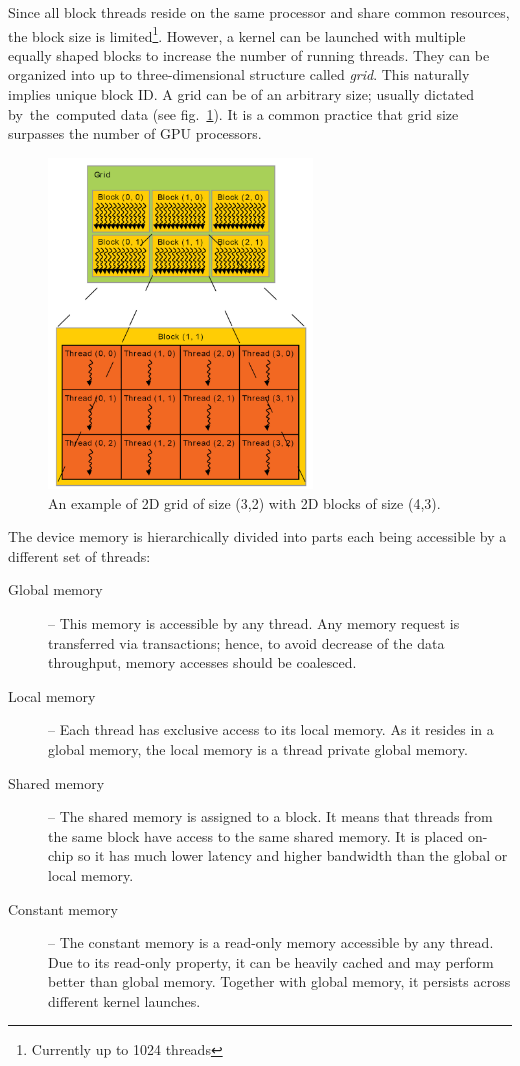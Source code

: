 Since all block threads reside on the same processor and share common resources, the block size is limited\footnote{Currently up to 1024 threads}. However, a kernel can be launched with multiple equally shaped blocks to increase the number of running threads. They can be organized into up to three-dimensional structure called \emph{grid}. This naturally implies unique block ID. A grid can be of an arbitrary size; usually dictated by~the~computed data (see fig.~\ref{fig02:grid}). It is a common practice that grid size surpasses the number of GPU processors.


\begin{figure}\centering
	\includegraphics[width=7cm]{img/grid}
	\caption{An example of 2D grid of size (3,2) with 2D blocks of size (4,3).}
	\label{fig02:grid}
\end{figure}


The device memory is hierarchically divided into parts each being accessible by a different set of threads:

\begin{description}
	\item[Global memory] -- This memory is accessible by any thread. Any memory request is transferred via transactions; hence, to avoid decrease of the data throughput, memory accesses should be coalesced. 
	\item[Local memory] -- Each thread has exclusive access to its local memory. As it resides in a global memory, the local memory is a thread private global memory.
	\item[Shared memory] -- The shared memory is assigned to a block. It means that threads from the same block have access to the same shared memory. It is placed on-chip so it has much lower latency and higher bandwidth than the global or local memory.
	\item[Constant memory] -- The constant memory is a read-only memory accessible by any thread. Due to its read-only property, it can be heavily cached and may perform better than global memory. Together with global memory, it persists across different kernel launches.
\end{description}

